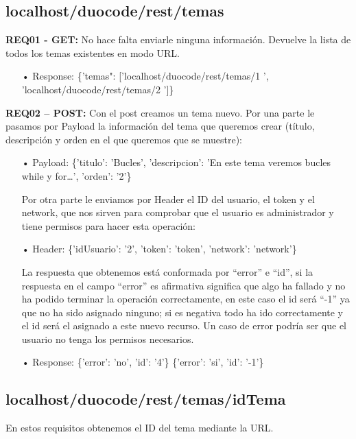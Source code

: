 
\subsection{localhost/duocode/rest/temas}
\textbf{REQ01 - GET:} No hace falta enviarle ninguna información. Devuelve la lista de todos los temas existentes en modo URL.

\begin{itemize}
\item[•] Response:
\{'temas": ['localhost/duocode/rest/temas/1 ', 'localhost/duocode/rest/temas/2 ']\}
\end{itemize}

\textbf{REQ02 – POST:} Con el post creamos un tema nuevo. Por una parte le pasamos por Payload la información del tema que queremos crear (título, descripción y orden en el que queremos que se muestre): 
\begin{itemize}
\item[•]Payload: 
\{'titulo': 'Bucles', 'descripcion': 'En este tema veremos bucles while y for…', 'orden': '2'\} \vspace{1em}

Por otra parte le enviamos por Header el ID del usuario, el token y el network, que nos sirven para comprobar que el usuario es administrador y tiene permisos para hacer esta operación:
\item[•]Header:
\{'idUsuario': '2', 'token': 'token', 'network': 'network'\}
\vspace{1em}

La respuesta que obtenemos está conformada por “error” e “id”, si la respuesta en el campo “error” es afirmativa significa que algo ha fallado y no ha podido terminar la operación correctamente, en este caso el id será “-1” ya que no ha sido asignado ninguno; si es negativa todo ha ido correctamente y el id será el asignado a este nuevo recurso. Un caso de error podría ser que el usuario no tenga los permisos necesarios.
\item[•]Response:
\{'error': 'no', 'id': '4'\}
\{'error': 'si', 'id': '-1'\}

\end{itemize}

\subsection{localhost/duocode/rest/temas/idTema}

En estos requisitos obtenemos el ID del tema mediante la URL.
\vspace{1em}


